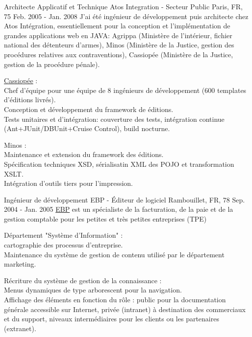 \begin{cventries}
  \cventry
    {Architecte Applicatif et Technique} %
    {Atos Integration - Secteur Public} %
    {Paris, FR, 75} %
    {Feb. 2005 - Jan. 2008} %
{
J'ai été ingénieur de développement puis architecte chez Atos Intégration, essentiellement pour la conception et l'implémentation de grandes applications web en JAVA: Agrippa (Ministère de l'intérieur, fichier national des détenteurs d'armes), Minos (Ministère de la Justice, gestion des procédures relatives aux contraventions), Cassiopée (Ministère de la Justice, gestion de la procédure pénale).
} %
{
      \begin{cvitems} %
        \item {\href{http://www.justice.gouv.fr/template/cache/embeds/embed-2086.html}{Cassiopée} :\\Chef d'équipe pour une équipe de 8 ingénieurs de développement (600 templates d'éditions livrés).\\Conception et développement du framework de éditions.\\Tests unitaires et d'intégration: couverture des tests, intégration continue (Ant+JUnit/DBUnit+Cruise Control), build nocturne.}
        \item {Minos :\\Maintenance et extension du framework des éditions.\\Spécification techniques XSD, sérialisatin XML des POJO et transformation XSLT.\\Intégration d'outils tiers pour l'impression.}
      \end{cvitems}
} %

  \cventry
    {Ingénieur de développement} %
    {EBP - \'Editeur de logiciel} %
    {Rambouillet, FR, 78} %
    {Sep. 2004 - Jan. 2005} %
    {\href{https://www.ebp.com}{EBP} est un spécialiste de la facturation, de la paie et de la gestion comptable pour les petites et très petites entreprises (TPE)} %
{
      \begin{cvitems} %
        \item {Département "Système d'Information" :\\cartographie des processus d'entreprise.\\Maintenance du système de gestion de contenu utilisé par le département marketing.}
        \item {Récriture du système de gestion de la connaissance :\\Menus dynamiques de type arborescent pour la navigation.\\Affichage des éléments en fonction du rôle : public pour la documentation générale accessible sur Internet, privée (intranet) à destination des commerciaux et du support, niveaux intermédiaires pour les clients ou les partenaires (extranet).}
      \end{cvitems}
} %


\end{cventries}
